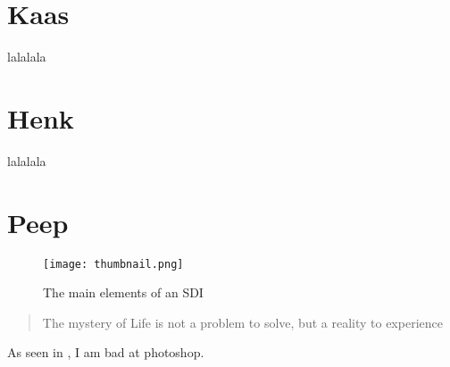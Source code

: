 \section{Kaas}
lalalala 


\section{Henk}
lalalala 


\section{Peep}
\begin{figure}
    \centering
    \graphicspath{ {images/} }
    \texttt{[image: thumbnail.png]}
    \caption{The main elements of an SDI}
    \label{fig:thumbnail}
\end{figure}

\begin{quote}
    The mystery of Life is not a problem to solve, but a reality to experience \cite{einstein}
\end{quote}

As seen in , I am bad at photoshop.
